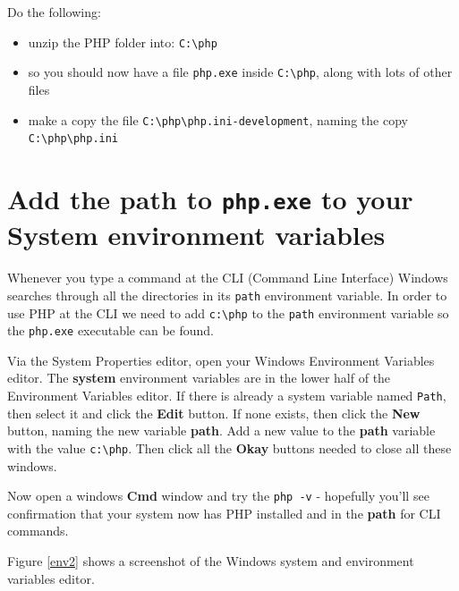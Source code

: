 \documentclass[a4paperpaper,openright]{book}
\begin{document}
Do the following:

\begin{itemize}
\item
  unzip the PHP folder into: \texttt{C:\textbackslash{}php}
\item
  so you should now have a file \texttt{php.exe} inside
  \texttt{C:\textbackslash{}php}, along with lots of other files
\item
  make a copy the file
  \texttt{C:\textbackslash{}php\textbackslash{}php.ini-development},
  naming the copy \texttt{C:\textbackslash{}php\textbackslash{}php.ini}
\end{itemize}

\hypertarget{add-the-path-to-php.exe-to-your-system-environment-variables}{%
\section{\texorpdfstring{Add the \textbf{path} to \texttt{php.exe} to
your System environment
variables}{Add the path to php.exe to your System environment variables}}\label{add-the-path-to-php.exe-to-your-system-environment-variables}}

Whenever you type a command at the CLI (Command Line Interface) Windows
searches through all the directories in its \texttt{path} environment
variable. In order to use PHP at the CLI we need to add
\texttt{c:\textbackslash{}php} to the \texttt{path} environment variable
so the \texttt{php.exe} executable can be found.

Via the System Properties editor, open your Windows Environment
Variables editor. The \textbf{system} environment variables are in the
lower half of the Environment Variables editor. If there is already a
system variable named \texttt{Path}, then select it and click the
\textbf{Edit} button. If none exists, then click the \textbf{New}
button, naming the new variable \textbf{path}. Add a new value to the
\textbf{path} variable with the value \texttt{c:\textbackslash{}php}.
Then click all the \textbf{Okay} buttons needed to close all these
windows.

Now open a windows \textbf{Cmd} window and try the \texttt{php\ -v} -
hopefully you'll see confirmation that your system now has PHP installed
and in the \textbf{path} for CLI commands.

Figure \ref{env2} shows a screenshot of the Windows system and
environment variables editor.
\end{document}
